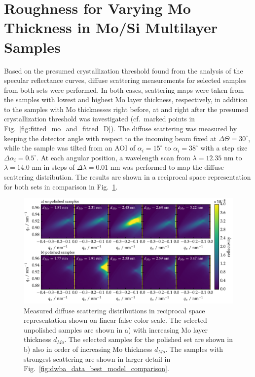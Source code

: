 \section{Roughness for Varying Mo Thickness in Mo/Si Multilayer Samples} \label{ch_diff:sec_mo_si_c}

Based on the presumed crystallization threshold found from the analysis of the specular reflectance curves, diffuse scattering measurements for selected samples from both sets were performed. In both cases, scattering maps were taken from the samples with lowest and highest Mo layer thickness, respectively, in addition to the samples with Mo thicknesses right before, at and right after the presumed crystallization threshold was investigated (cf.~marked points in Fig.~\ref{fig:fitted_mo_and_fitted_D}). The diffuse scattering was measured by keeping the detector angle with respect to the incoming beam fixed at $\Delta\Theta = 30^\circ$, while the sample was tilted from an AOI of $\alpha_i=15^\circ$ to $\alpha_i=38^\circ$ with a step size $\Delta\alpha_i = 0.5^\circ$. At each angular position, a wavelength scan from $\lambda=12.35$ nm to $\lambda=14.0$ nm in steps of $\Delta\lambda = 0.01$ nm was performed to map the diffuse scattering distribution. The results are shown in a reciprocal space representation for both sets in comparison in Fig.~\ref{fig:diffuse}.
\begin{figure}[htbp]
\centering
\includegraphics[width=\textwidth]{img/MoSiC_diffuse_measurements}
\caption{Measured diffuse scattering distributions in reciprocal space representation shown on linear false-color scale. The selected unpolished samples are shown in a) with increasing Mo layer thickness $d_{Mo}$. The selected samples for the polished set are shown in b) also in order of increasing Mo thickness $d_{Mo}$. The samples with strongest scattering are shown in larger detail in Fig.~\ref{fig:dwba_data_best_model_comparison}.}
\label{fig:diffuse}
\end{figure}
